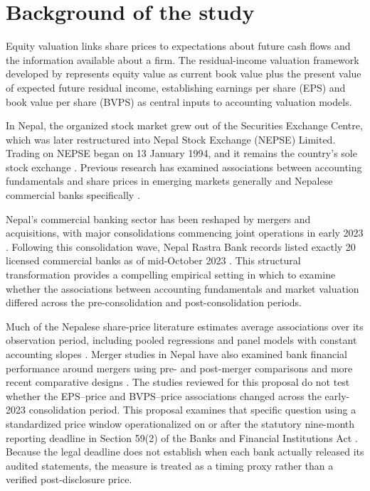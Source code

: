\section{Background of the study}

Equity valuation links share prices to expectations about future cash flows and
the information available about a firm. The residual-income valuation framework
developed by \citet{ohlson1995} represents equity value as current book value
plus the present value of expected future residual income, establishing earnings
per share (EPS) and book value per share (BVPS) as central inputs to accounting
valuation models.

In Nepal, the organized stock market grew out of the Securities Exchange Centre,
which was later restructured into Nepal Stock Exchange (NEPSE) Limited. Trading
on NEPSE began on 13 January 1994, and it remains the country's sole stock
exchange \citep{nepse2017}. Previous research has examined associations between
accounting fundamentals and share prices in emerging markets generally
\citep{sharma2011,collins1997} and Nepalese commercial banks specifically
\citep{bhattarai2014,pradhan2016,gurungdahal2025}.

Nepal's commercial banking sector has been reshaped by mergers and
acquisitions, with major consolidations commencing joint operations in early
2023 \citep{gbime2022agm,hbl2023report,kumari2022sgm,nimb2023report}. Following
this consolidation wave, Nepal Rastra Bank records listed exactly 20 licensed
commercial banks as of mid-October 2023 \citep{nrb2023list}. This structural
transformation provides a compelling empirical setting in which to examine
whether the associations between accounting fundamentals and market valuation
differed across the pre-consolidation and post-consolidation periods.

Much of the Nepalese share-price literature estimates average associations over
its observation period, including pooled regressions and panel models with
constant accounting slopes \citep{bhattarai2014,chhetri2023,joshi2023,pant2024,
chaudhari2025,gurungdahal2025}. Merger studies in Nepal have also examined bank
financial performance around mergers using pre- and post-merger comparisons and
more recent comparative designs
\citep{adhikari2023,adhikari2023cbr,acharya2026merger}. The studies reviewed for
this proposal do
not test whether the EPS--price and BVPS--price associations changed across the
early-2023 consolidation period. This proposal examines that specific question
using a standardized price window operationalized on or after the statutory
nine-month reporting deadline in Section 59(2) of the Banks and Financial
Institutions Act \citep{bafia2017}. Because the legal deadline does not establish
when each bank actually released its audited statements, the measure is treated
as a timing proxy rather than a verified post-disclosure price.
